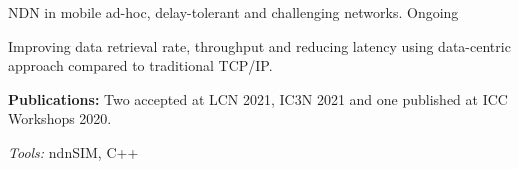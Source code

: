 


\begin{cventries}

\cventry
  {} %
  {NDN in mobile ad-hoc, delay-tolerant and challenging networks.} %
  {Ongoing} %
  {} %
  {
    \vspace{-3mm}
    \begin{cvitems} %
      \item {Improving data retrieval rate, throughput and reducing latency using data-centric approach compared to traditional TCP/IP.}
      \item {\textbf{Publications:} Two accepted at LCN 2021, IC3N 2021 and one published at ICC Workshops 2020.}
      \item {\textit{Tools:} ndnSIM, C++}
    \end{cvitems}
  }
  {}



\end{cventries}
